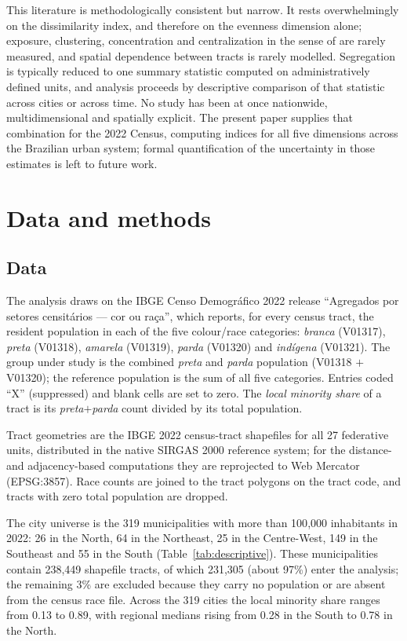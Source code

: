 \documentclass[pdflatex,sn-basic]{sn-jnl}%
\begin{document}
This literature is methodologically consistent but narrow. It rests overwhelmingly on the dissimilarity index, and therefore on the evenness dimension alone; exposure, clustering, concentration and centralization in the sense of \citet{massey1988dimensions} are rarely measured, and spatial dependence between tracts is rarely modelled. Segregation is typically reduced to one summary statistic computed on administratively defined units, and analysis proceeds by descriptive comparison of that statistic across cities or across time. No study has been at once nationwide, multidimensional and spatially explicit. The present paper supplies that combination for the 2022 Census, computing indices for all five dimensions across the Brazilian urban system; formal quantification of the uncertainty in those estimates is left to future work.

\section{Data and methods}\label{sec:methods}

\subsection{Data}\label{subsec:data}

The analysis draws on the IBGE Censo Demogr\'afico 2022 release ``Agregados por setores censit\'arios --- cor ou ra\c{c}a'', which reports, for every census tract, the resident population in each of the five colour/race categories: \emph{branca} (V01317), \emph{preta} (V01318), \emph{amarela} (V01319), \emph{parda} (V01320) and \emph{ind\'igena} (V01321). The group under study is the combined \emph{preta} and \emph{parda} population (V01318 $+$ V01320); the reference population is the sum of all five categories. Entries coded ``X'' (suppressed) and blank cells are set to zero. The \emph{local minority share} of a tract is its \emph{preta}$+$\emph{parda} count divided by its total population.

Tract geometries are the IBGE 2022 census-tract shapefiles for all 27 federative units, distributed in the native SIRGAS 2000 reference system; for the distance- and adjacency-based computations they are reprojected to Web Mercator (EPSG:3857). Race counts are joined to the tract polygons on the tract code, and tracts with zero total population are dropped.

The city universe is the 319 municipalities with more than 100{,}000 inhabitants in 2022: 26 in the North, 64 in the Northeast, 25 in the Centre-West, 149 in the Southeast and 55 in the South (Table~\ref{tab:descriptive}). These municipalities contain 238{,}449 shapefile tracts, of which 231{,}305 (about 97\%) enter the analysis; the remaining 3\% are excluded because they carry no population or are absent from the census race file. Across the 319 cities the local minority share ranges from 0.13 to 0.89, with regional medians rising from 0.28 in the South to 0.78 in the North.
\end{document}
